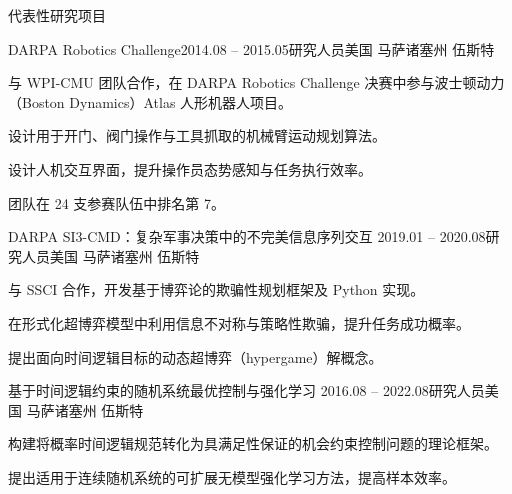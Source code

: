 \documentclass{resume}
\begin{document}
\begin{rSection}{代表性研究项目}

\begin{rSubsection}{DARPA Robotics Challenge}{2014.08 -- 2015.05}{研究人员}{美国 马萨诸塞州 伍斯特}
\item 与 WPI-CMU 团队合作，在 DARPA Robotics Challenge 决赛中参与波士顿动力（Boston Dynamics）Atlas 人形机器人项目。
\item 设计用于开门、阀门操作与工具抓取的机械臂运动规划算法。
\item 设计人机交互界面，提升操作员态势感知与任务执行效率。
\item 团队在 24 支参赛队伍中排名第 7。
\end{rSubsection}

\begin{rSubsection}
{DARPA SI3-CMD：复杂军事决策中的不完美信息序列交互}
{2019.01 -- 2020.08}{研究人员}{美国 马萨诸塞州 伍斯特}
\item 与 SSCI 合作，开发基于博弈论的欺骗性规划框架及 Python 实现。
\item 在形式化超博弈模型中利用信息不对称与策略性欺骗，提升任务成功概率。
\item 提出面向时间逻辑目标的动态超博弈（hypergame）解概念。
\end{rSubsection}

\begin{rSubsection}
{基于时间逻辑约束的随机系统最优控制与强化学习}
{2016.08 -- 2022.08}{研究人员}{美国 马萨诸塞州 伍斯特}
\item 构建将概率时间逻辑规范转化为具满足性保证的机会约束控制问题的理论框架。
\item 提出适用于连续随机系统的可扩展无模型强化学习方法，提高样本效率。
\end{rSubsection}

\end{rSection}
\end{document}
